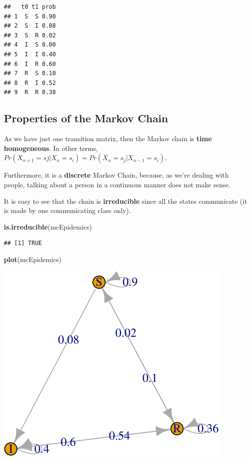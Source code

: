 \documentclass[
]{article}
\newenvironment{Shaded}{\begin{snugshade}}{\end{snugshade}}
\newcommand{\KeywordTok}[1]{\textcolor[rgb]{0.13,0.29,0.53}{\textbf{#1}}}
\newcommand{\NormalTok}[1]{#1}
\begin{document}
\begin{verbatim}
##   t0 t1 prob
## 1  S  S 0.90
## 2  S  I 0.08
## 3  S  R 0.02
## 4  I  S 0.00
## 5  I  I 0.40
## 6  I  R 0.60
## 7  R  S 0.10
## 8  R  I 0.52
## 9  R  R 0.38
\end{verbatim}

\hypertarget{properties-of-the-markov-chain}{%
\subsection{Properties of the Markov
Chain}\label{properties-of-the-markov-chain}}

As we have just one transition matrix, then the Markov chain is
\textbf{time homogeneous}. In other terms,
\(Pr (X_{n+1} = sj |X_n = s_i) = Pr(X_n = s_j |X_{n−1} = s_i)\).

Furthermore, it is a \textbf{discrete} Markov Chain, because, as we're
dealing with people, talking about a person in a continuous manner does
not make sense.

It is easy to see that the chain is \textbf{irreducible} since all the
states communicate (it is made by one communicating class only).

\begin{Shaded}
\begin{Highlighting}[]
\KeywordTok{is.irreducible}\NormalTok{(mcEpidemics)}
\end{Highlighting}
\end{Shaded}

\begin{verbatim}
## [1] TRUE
\end{verbatim}

\begin{Shaded}
\begin{Highlighting}[]
\KeywordTok{plot}\NormalTok{(mcEpidemics)}
\end{Highlighting}
\end{Shaded}

\includegraphics{assign3_group4_solution_files/figure-latex/Plot of the Graph-1.pdf}
\end{document}
